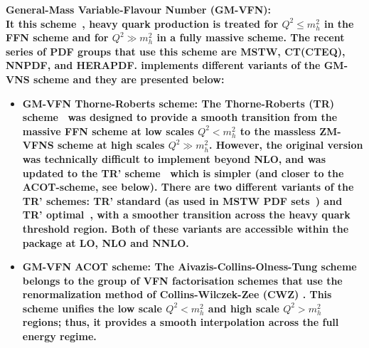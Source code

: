 \begin{description}
\item \bf{General-Mass Variable-Flavour Number (GM-VFN):}\rm
\\
It this scheme~\cite{VFN}, heavy quark production is treated for
$Q^2 \le m_h^2$ in the FFN scheme and for $Q^2 \gg m_h^2$
in a fully massive scheme. 
The recent series of PDF groups that use this scheme are MSTW, CT(CTEQ), NNPDF, and HERAPDF.
\fitter implements different variants of the GM-VNS scheme and they are presented below:
% 
\begin{itemize}
%
\item \bf {GM-VFN Thorne-Roberts scheme:} \rm
%
%
The Thorne-Roberts (TR) scheme~\cite{Thorne:1997ga} was designed to provide a smooth transition 
from the massive FFN scheme at low scales $Q^2 < m_h^2$ to the massless ZM-VFNS scheme at high scales $Q^2 \gg m_h^2$. 
However, the original version was technically difficult to implement beyond NLO, and was updated 
to the TR' scheme~\cite{Thorne:2006qt} which is simpler (and closer to the ACOT-scheme, see below).
There are two different variants of the TR' schemes: TR' standard (as used in MSTW PDF sets~\cite{Thorne:2006qt,MSTWpdf}) 
and TR' optimal~\cite{Thorne:6180}, with a smoother transition across the heavy quark threshold region. 
Both of these variants are accessible within the \fitter package at LO, NLO and NNLO.
\vspace{0.1cm}
\item \bf {GM-VFN ACOT scheme:} \rm
The Aivazis-Collins-Olness-Tung scheme belongs to the group of VFN factorisation 
schemes that use the renormalization method of Collins-Wilczek-Zee (CWZ) \cite{CWZ}.
This scheme unifies the low scale $Q^2 < m_h^2$ and high scale $Q^2 > m_h^2$ regions; 
thus, it provides a smooth interpolation across the full energy regime. 

\end{itemize}
\end{description}
